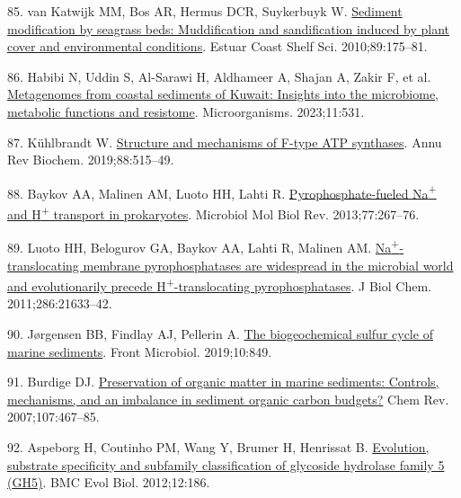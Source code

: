 \documentclass[
  12 pt,
]{article}
\newlength{\cslhangindent}
\newlength{\cslentryspacingunit} %
\newenvironment{CSLReferences}[2] %
 {%
  \setlength{\parindent}{0pt}
  \ifodd #1
  \let\oldpar\par
  \def\par{\hangindent=\cslhangindent\oldpar}
  \fi
  \setlength{\parskip}{#2\cslentryspacingunit}
 }%
 {}
\begin{document}
\begin{CSLReferences}{0}{0}
\leavevmode{}%
85. van Katwijk MM, Bos AR, Hermus DCR, Suykerbuyk W. \href{https://doi.org/10.1016/j.ecss.2010.06.008}{Sediment modification by seagrass beds: Muddification and sandification induced by plant cover and environmental conditions}. Estuar Coast Shelf Sci. 2010;89:175--81.

\leavevmode{}%
86. Habibi N, Uddin S, Al-Sarawi H, Aldhameer A, Shajan A, Zakir F, et al. \href{https://doi.org/10.3390/microorganisms11020531}{Metagenomes from coastal sediments of {Kuwait}: Insights into the microbiome, metabolic functions and resistome}. Microorganisms. 2023;11:531.

\leavevmode{}%
87. Kühlbrandt W. \href{https://doi.org/10.1146/annurev-biochem-013118-110903}{Structure and mechanisms of {F-type ATP} synthases}. Annu Rev Biochem. 2019;88:515--49.

\leavevmode{}%
88. Baykov AA, Malinen AM, Luoto HH, Lahti R. \href{https://doi.org/10.1128/mmbr.00003-13}{Pyrophosphate-fueled {Na}{\textsuperscript{+}} and {H}{\textsuperscript{+}} transport in prokaryotes}. Microbiol Mol Biol Rev. 2013;77:267--76.

\leavevmode{}%
89. Luoto HH, Belogurov GA, Baykov AA, Lahti R, Malinen AM. \href{https://doi.org/10.1074/jbc.M111.244483}{Na{\textsuperscript{+}}-translocating membrane pyrophosphatases are widespread in the microbial world and evolutionarily precede {H}{\textsuperscript{+}}-translocating pyrophosphatases}. J Biol Chem. 2011;286:21633--42.

\leavevmode{}%
90. Jørgensen BB, Findlay AJ, Pellerin A. \href{https://doi.org/10.3389/fmicb.2019.00849}{The biogeochemical sulfur cycle of marine sediments}. Front Microbiol. 2019;10:849.

\leavevmode{}%
91. Burdige DJ. \href{https://doi.org/10.1021/cr050347q}{Preservation of organic matter in marine sediments: Controls, mechanisms, and an imbalance in sediment organic carbon budgets?} Chem Rev. 2007;107:467--85.

\leavevmode{}%
92. Aspeborg H, Coutinho PM, Wang Y, Brumer H, Henrissat B. \href{https://doi.org/10.1186/1471-2148-12-186}{Evolution, substrate specificity and subfamily classification of glycoside hydrolase family 5 ({GH5})}. BMC Evol Biol. 2012;12:186.


\end{CSLReferences}
\end{document}
